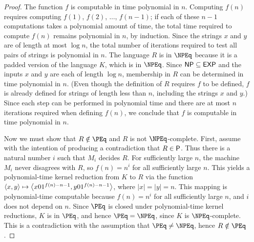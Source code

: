 \begin{proof}
  The function $f$ is computable in time polynomial in $n$.
  Computing $f(n)$ requires computing $f(1)$, $f(2)$, $\dotsc$, $f(n - 1)$; if each of these $n - 1$ computations takes a polynomial amount of time, the total time required to compute $f(n)$ remains polynomial in $n$, by induction.
  Since the strings $x$ and $y$ are of length at most $\log n$, the total number of iterations required to test all pairs of strings is polynomial in $n$.
  The language $R$ is in $\NPEq$ because it is a padded version of the language $K$, which is in $\NPEq$.
  Since $\NP \subseteq \EXP$ and the inputs $x$ and $y$ are each of length $\log n$, membership in $R$ can be determined in time polynomial in $n$.
  (Even though the definition of $R$ requires $f$ to be defined, $f$ is already defined for strings of length less than $n$, including the strings $x$ and $y$.)
  Since each step can be performed in polynomial time and there are at most $n$ iterations required when defining $f(n)$, we conclude that $f$ is computable in time polynomial in $n$.

  Now we must show that $R \notin \PEq$ and $R$ is not $\NPEq$-complete.
  First, assume with the intention of producing a contradiction that $R \in \P$.
  Thus there is a natural number $i$ such that $M_i$ decides $R$.
  For sufficiently large $n$, the machine $M_i$ never disagrees with $R$, so $f(n) = n^i$ for all sufficiently large $n$.
  This yields a polynomial-time kernel reduction from $K$ to $R$ via the function $\pair{x}{y} \mapsto \left\langle x 0 1^{f(n) - n - 1}, y 0 1^{f(n) - n - 1}\right\rangle$, where $|x| = |y| = n$.
  This mapping is polynomial-time computable because $f(n) = n^i$ for all sufficiently large $n$, and $i$ does not depend on $n$.
  Since $\PEq$ is closed under polynomial-time kernel reductions, $K$ is in $\PEq$, and hence $\PEq = \NPEq$, since $K$ is $\NPEq$-complete.
  This is a contradiction with the assumption that $\PEq \neq \NPEq$, hence $R \notin \PEq$.


\end{proof}
